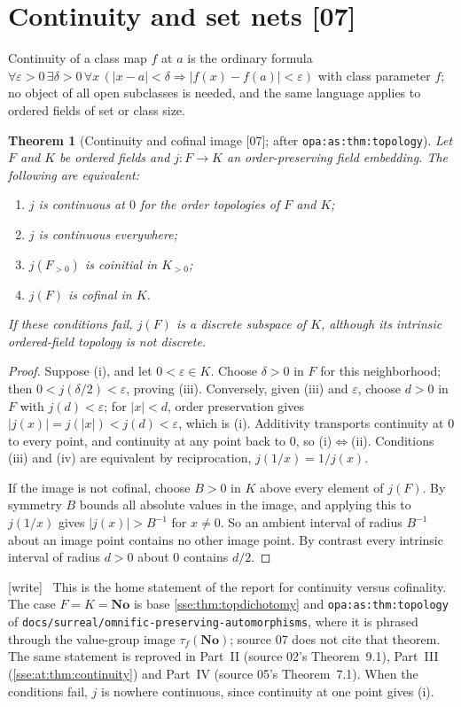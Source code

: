 \documentclass[11pt,a4paper]{article}
\numberwithin{equation}{section}
\theoremstyle{plain}
\newtheorem{theorem}{Theorem}[section]
\theoremstyle{definition}
\theoremstyle{remark}
\newcommand{\No}{\mathbf{No}}
\newcommand{\lbl}[1]{\nolinkurl{#1}}%
\newcommand{\fn}[1]{\nolinkurl{#1}}%
\newcommand{\src}[1]{\textup{\textsf{\small[#1]}}}%
\newcommand{\wtag}{\textup{\textsf{[write]}}}%
\newenvironment{wnote}{\par\smallskip\noindent\wtag\ }{\par\smallskip}
\begin{document}
\section{Continuity and set nets \src{07}}\label{sse:an:top:section}

Continuity of a class map $f$ at $a$ is the ordinary formula
$\forall\varepsilon>0\,\exists\delta>0\,\forall x\,
(|x-a|<\delta\Rightarrow|f(x)-f(a)|<\varepsilon)$ with class parameter $f$;
no object of all open subclasses is needed, and the same language applies to
ordered fields of set or class size.

\begin{theorem}[Continuity and cofinal image \src{07}; after \lbl{opa:as:thm:topology}]\label{sse:an:top:criterion}
Let $F$ and $K$ be ordered fields and $j:F\to K$ an order-preserving field
embedding. The following are equivalent:
\begin{enumerate}[label=(\roman*)]
\item $j$ is continuous at $0$ for the order topologies of $F$ and $K$;
\item $j$ is continuous everywhere;
\item $j(F_{>0})$ is coinitial in $K_{>0}$;
\item $j(F)$ is cofinal in $K$.
\end{enumerate}
If these conditions fail, $j(F)$ is a discrete subspace of $K$, although its
intrinsic ordered-field topology is not discrete.
\end{theorem}
\begin{proof}
Suppose (i), and let $0<\varepsilon\in K$. Choose $\delta>0$ in $F$ for this
neighborhood; then $0<j(\delta/2)<\varepsilon$, proving (iii). Conversely,
given (iii) and $\varepsilon$, choose $d>0$ in $F$ with $j(d)<\varepsilon$;
for $|x|<d$, order preservation gives $|j(x)|=j(|x|)<j(d)<\varepsilon$, which
is (i). Additivity transports continuity at $0$ to every point, and
continuity at any point back to $0$, so (i)$\iff$(ii). Conditions (iii) and
(iv) are equivalent by reciprocation, $j(1/x)=1/j(x)$.

If the image is not cofinal, choose $B>0$ in $K$ above every element of
$j(F)$. By symmetry $B$ bounds all absolute values in the image, and applying
this to $j(1/x)$ gives $|j(x)|>B^{-1}$ for $x\ne0$. So an ambient interval of
radius $B^{-1}$ about an image point contains no other image point. By
contrast every intrinsic interval of radius $d>0$ about $0$ contains $d/2$.
\end{proof}
\begin{wnote}
This is the home statement of the report for continuity versus cofinality.
The case $F=K=\No$ is base \cref{sse:thm:topdichotomy} and
\lbl{opa:as:thm:topology} of \fn{docs/surreal/omnific-preserving-automorphisms},
where it is phrased through the value-group image $\tau_f(\No)$; source 07
does not cite that theorem. The same statement is reproved in Part~II
(source 02's Theorem~9.1), Part~III (\cref{sse:at:thm:continuity}) and
Part~IV (source 05's Theorem~7.1). When the conditions fail, $j$ is
nowhere continuous, since continuity at one point gives (i).
\end{wnote}
\end{document}
